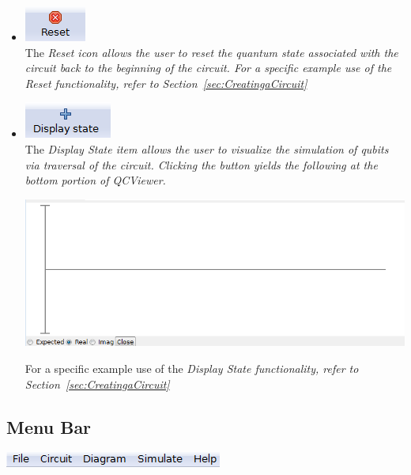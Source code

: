 \documentclass[10pt]{article}
\theoremstyle{definition}
\begin{document}
\begin{itemize}
\item \includegraphics{Figures/Navigation/Reset.png}\\ 

The \em Reset \em icon allows the user to reset the quantum state associated with the circuit back to the beginning of the circuit. For a specific example use of the \em Reset \em functionality, refer to Section~\ref{sec:CreatingaCircuit}

\item \includegraphics{Figures/Navigation/DisplayState.png} \\

The \em Display State \em item allows the user to visualize the simulation of qubits via traversal of the circuit. Clicking the button yields the following at the bottom portion of QCViewer.

\begin{center}
\includegraphics[scale=0.75]{Figures/DisplayState.png}
\end{center}

For a specific example use of the \em Display State \em functionality, refer to Section~\ref{sec:CreatingaCircuit}

\end{itemize}

\subsection{Menu Bar}\label{sub:MenuBar}

\begin{center}
\includegraphics{Figures/Menu/MenuBar.png}
\end{center}
\end{document}
